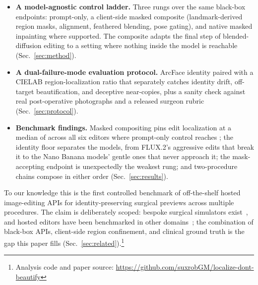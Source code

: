 \begin{itemize}
  \item \textbf{A model-agnostic control ladder.} Three rungs over the same
  black-box endpoints: prompt-only, a client-side masked composite
  (landmark-derived region masks, alignment, feathered blending, pose gating),
  and native masked inpainting where supported. The composite adapts the final
  step of blended-diffusion editing to a setting where nothing inside the model
  is reachable (Sec.~\ref{sec:method}).
  \item \textbf{A dual-failure-mode evaluation protocol.} ArcFace identity paired
  with a CIELAB region-localization ratio that separately catches identity drift,
  off-target beautification, and deceptive near-copies, plus a sanity check
  against real post-operative photographs and a released surgeon rubric
  (Sec.~\ref{sec:protocol}).
  \item \textbf{Benchmark findings.} Masked compositing pins edit localization at
  a median of \MedLocComposite{} across all six editors where prompt-only control
  reaches \MedLocPromptOnly{}; the identity floor separates the models, from
  FLUX.2's aggressive edits that break it to the Nano Banana models' gentle ones
  that never approach it; the mask-accepting endpoint is unexpectedly the
  weakest rung; and two-procedure chains compose in either order
  (Sec.~\ref{sec:results}).
\end{itemize}

To our knowledge this is the first controlled benchmark of off-the-shelf hosted
image-editing APIs for identity-preserving surgical previews across multiple
procedures. The claim is deliberately scoped: bespoke surgical simulators
exist~\cite{knoedler2024rhinoplastygan,agarwal2026envisage}, and hosted editors
have been benchmarked in other domains~\cite{qian2025giebench,gptimgeval2025};
the combination of black-box APIs, client-side region confinement, and clinical
ground truth is the gap this paper fills
(Sec.~\ref{sec:related}).\footnote{Analysis code and paper source:
\url{https://github.com/suxrobGM/localize-dont-beautify}}

